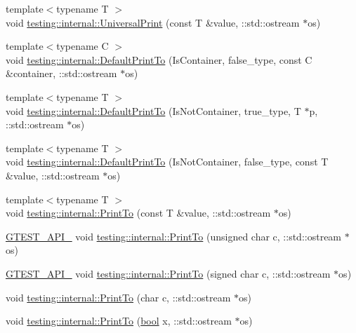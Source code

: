 \begin{DoxyCompactItemize}
{\footnotesize template$<$typename T $>$ }\\void \hyperlink{namespacetesting_1_1internal_a30708fa2bacf11895b03bdb21eb72309}{testing\+::internal\+::\+Universal\+Print} (const T \&value, \+::std\+::ostream $\ast$os)
\item 
{\footnotesize template$<$typename C $>$ }\\void \hyperlink{namespacetesting_1_1internal_ac7dfe02c4c1cbfe89c23a93d873079c5}{testing\+::internal\+::\+Default\+Print\+To} (Is\+Container, false\+\_\+type, const C \&container, \+::std\+::ostream $\ast$os)
\item 
{\footnotesize template$<$typename T $>$ }\\void \hyperlink{namespacetesting_1_1internal_affa1f94e3ba8db8b964553c2871bf339}{testing\+::internal\+::\+Default\+Print\+To} (Is\+Not\+Container, true\+\_\+type, T $\ast$p, \+::std\+::ostream $\ast$os)
\item 
{\footnotesize template$<$typename T $>$ }\\void \hyperlink{namespacetesting_1_1internal_a78e4937ba564f01dac2ff25f3eece0ec}{testing\+::internal\+::\+Default\+Print\+To} (Is\+Not\+Container, false\+\_\+type, const T \&value, \+::std\+::ostream $\ast$os)
\item 
{\footnotesize template$<$typename T $>$ }\\void \hyperlink{namespacetesting_1_1internal_adb3c27150dbe661db0e0c4be27533460}{testing\+::internal\+::\+Print\+To} (const T \&value, \+::std\+::ostream $\ast$os)
\item 
\hyperlink{gtest-port_8h_aa73be6f0ba4a7456180a94904ce17790}{G\+T\+E\+S\+T\+\_\+\+A\+P\+I\+\_\+} void \hyperlink{namespacetesting_1_1internal_ab7524d6d3ab8c31b1deea88bf61783bb}{testing\+::internal\+::\+Print\+To} (unsigned char c, \+::std\+::ostream $\ast$os)
\item 
\hyperlink{gtest-port_8h_aa73be6f0ba4a7456180a94904ce17790}{G\+T\+E\+S\+T\+\_\+\+A\+P\+I\+\_\+} void \hyperlink{namespacetesting_1_1internal_ad453af399370e394881079c243abacb4}{testing\+::internal\+::\+Print\+To} (signed char c, \+::std\+::ostream $\ast$os)
\item 
void \hyperlink{namespacetesting_1_1internal_a476bd3d411d4f129620aaf8999c257c0}{testing\+::internal\+::\+Print\+To} (char c, \+::std\+::ostream $\ast$os)
\item 
void \hyperlink{namespacetesting_1_1internal_a2979ac1ad3e05c51dcd7dca2eb34e6ce}{testing\+::internal\+::\+Print\+To} (\hyperlink{classbool}{bool} x, \+::std\+::ostream $\ast$os)
\item 

\end{DoxyCompactItemize}
